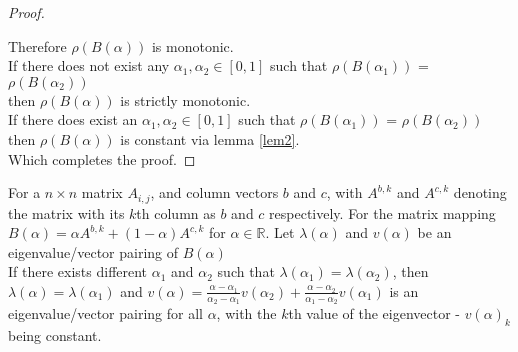\begin{proof}
\begin{itemize}[leftmargin=*,labelsep=4mm]
\end{itemize}
Therefore $\rho(B(\alpha))$ is monotonic.\\
If there does not exist any $\alpha_1,\alpha_2\in[0,1]$ such that $\rho(B(\alpha_1))$ = $\rho(B(\alpha_2))$\\
\-\hspace{8mm}then $\rho(B(\alpha))$ is strictly monotonic.\\
If there does exist an $\alpha_1,\alpha_2\in[0,1]$ such that $\rho(B(\alpha_1))$ = $\rho(B(\alpha_2))$\\
\-\hspace{8mm}then $\rho(B(\alpha))$ is constant via lemma \ref{lem2}.\\
Which completes the proof.
\end{proof}


\begin{Theorem}\label{th:3}
For a $n\times n$ matrix $A_{i,j}$, and column vectors $b$ and $c$, with $A^{b,k}$ and $A^{c,k}$ denoting the matrix with its $k$th column as $b$ and $c$ respectively. For the matrix mapping $B(\alpha) = \alpha A^{b,k} + (1-\alpha)A^{c,k}$ for $\alpha\in\mathbb{R}$. Let $\lambda(\alpha)$ and $v(\alpha)$ be an eigenvalue/vector pairing of $B(\alpha)$\\
If there exists different $\alpha_1$ and $\alpha_2$ such that $\lambda(\alpha_1)=\lambda(\alpha_2)$, then $\lambda(\alpha)=\lambda(\alpha_1)$ and $v(\alpha)=\frac{\alpha-\alpha_1}{\alpha_2-\alpha_1}v(\alpha_2)+\frac{\alpha-\alpha_2}{\alpha_1-\alpha_2}v(\alpha_1)$ is an eigenvalue/vector pairing for all $\alpha$, with the $k$th value of the eigenvector - $v(\alpha)_k$ being constant.
\end{Theorem}
